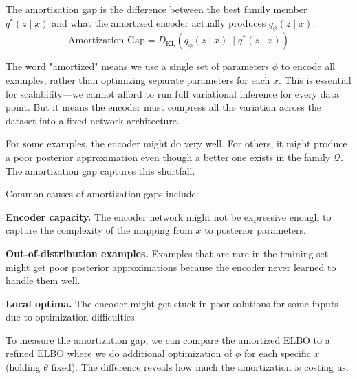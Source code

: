 The amortization gap is the difference between the best family member $q^*(z \mid x)$ and what the amortized encoder actually produces $q_\phi(z \mid x)$:
%
\begin{equation}
\text{Amortization Gap} = D_{\text{KL}}(q_\phi(z \mid x) \| q^*(z \mid x))
\end{equation}

\vspace{0.3cm}

The word "amortized" means we use a single set of parameters $\phi$ to encode all examples, rather than optimizing separate parameters for each $x$. This is essential for scalability---we cannot afford to run full variational inference for every data point. But it means the encoder must compress all the variation across the dataset into a fixed network architecture.

\vspace{0.3cm}

For some examples, the encoder might do very well. For others, it might produce a poor posterior approximation even though a better one exists in the family $\mathcal{Q}$. The amortization gap captures this shortfall.

\vspace{0.3cm}

Common causes of amortization gaps include:

\vspace{0.3cm}

\textbf{Encoder capacity.} The encoder network might not be expressive enough to capture the complexity of the mapping from $x$ to posterior parameters.

\vspace{0.3cm}

\textbf{Out-of-distribution examples.} Examples that are rare in the training set might get poor posterior approximations because the encoder never learned to handle them well.

\vspace{0.3cm}

\textbf{Local optima.} The encoder might get stuck in poor solutions for some inputs due to optimization difficulties.

\vspace{0.3cm}

To measure the amortization gap, we can compare the amortized ELBO to a refined ELBO where we do additional optimization of $\phi$ for each specific $x$ (holding $\theta$ fixed). The difference reveals how much the amortization is costing us.


